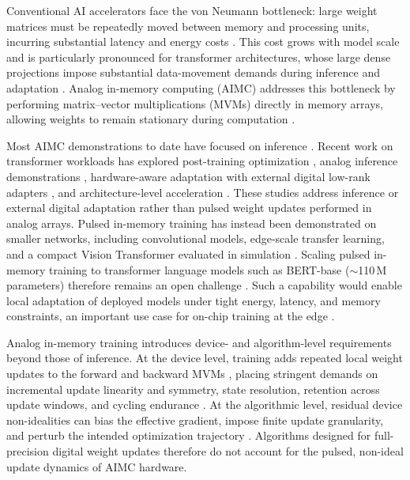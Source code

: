 \documentclass[fleqn,10pt]{wlscirep}
\begin{document}
\noindent
Conventional AI accelerators face the von Neumann bottleneck: large weight matrices must be repeatedly moved between memory and processing units, incurring substantial latency and energy costs \cite{horowitz2014computing,sze2017efficient}.
This cost grows with model scale and is particularly pronounced for transformer architectures, whose large dense projections impose substantial data-movement demands during inference and adaptation \cite{vaswani2017attention,ding2023delta}.
Analog in-memory computing (AIMC) addresses this bottleneck by performing matrix--vector multiplications (MVMs) directly in memory arrays, allowing weights to remain stationary during computation \cite{ielmini2018imc,wan2022neurram,rasch2024fastrobust}.

\noindent
Most AIMC demonstrations to date have focused on inference \cite{aguirre2024memristor_ann_review,wan2022neurram,chen2025albertanalog}.
Recent work on transformer workloads has explored post-training optimization \cite{lammie2024pt_roberta}, analog inference demonstrations \cite{chen2025albertanalog}, hardware-aware adaptation with external digital low-rank adapters \cite{li2026ahwa_lora}, and architecture-level acceleration \cite{leroux2025aimc_attention,buchel2025moe_3d_aimc}.
These studies address inference or external digital adaptation rather than pulsed weight updates performed in analog arrays.
Pulsed in-memory training has instead been demonstrated on smaller networks, including convolutional models, edge-scale transfer learning, and a compact Vision Transformer evaluated in simulation \cite{ambrogio2018analogtraining,li2018insitu,wang2019insitu,ando2025transfer,rasch2024fastrobust}.
Scaling pulsed in-memory training to transformer language models such as BERT-base (\(\sim\)110\,M parameters) therefore remains an open challenge \cite{devlin2019bert}.
Such a capability would enable local adaptation of deployed models under tight energy, latency, and memory constraints, an important use case for on-chip training at the edge \cite{gokmen2016rpu,zhou2019edgeintelligence}.

\noindent
Analog in-memory training introduces device- and algorithm-level requirements beyond those of inference.
At the device level, training adds repeated local weight updates to the forward and backward MVMs \cite{gokmen2016rpu,ambrogio2018analogtraining,rasch2024fastrobust}, placing stringent demands on incremental update linearity and symmetry, state resolution, retention across update windows, and cycling endurance \cite{gokmen2021ttv2,rasch2024fastrobust,won2023advs_6t1c}.
At the algorithmic level, residual device non-idealities can bias the effective gradient, impose finite update granularity, and perturb the intended optimization trajectory \cite{ambrogio2018analogtraining,wu2025responsefunctions,rasch2024fastrobust}.
Algorithms designed for full-precision digital weight updates therefore do not account for the pulsed, non-ideal update dynamics of AIMC hardware.
\end{document}
